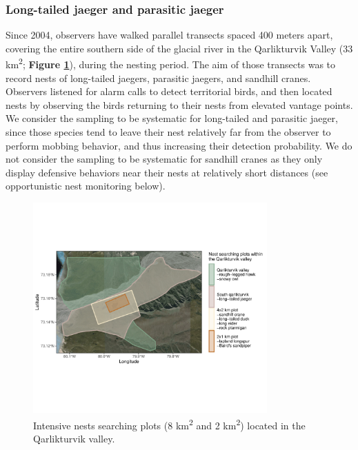 \documentclass[a4paper,twoside,10pt]{article}
\begin{document}
\subsubsection*{Long-tailed jaeger and parasitic jaeger}
Since 2004, observers have walked parallel transects spaced 400 meters apart, covering the entire southern side of the glacial river in the Qarlikturvik Valley (33 km\textsuperscript{2}; \textbf{Figure \ref{figure:qarlikturvik_valley}}), during the nesting period. The aim of those transects was to record nests of long-tailed jaegers, parasitic jaegers, and sandhill cranes. Observers listened for alarm calls to detect territorial birds, and then located nests by observing the birds returning to their nests from elevated vantage points. We consider the sampling to be systematic for long-tailed and parasitic jaeger, since those species tend to leave their nest relatively far from the observer to perform mobbing behavior, and thus increasing their detection probability. We do not consider the sampling to be systematic for sandhill cranes as they only display defensive behaviors near their nests at relatively short distances (see opportunistic nest monitoring below).

\begin{figure}
\centering
  \includegraphics[width=0.8\textwidth, angle=0]{figures/qarlikturvik_valley.pdf}
  \vspace{-70pt} %
  \caption{Intensive nests searching plots (8 km\textsuperscript{2} and 2 km\textsuperscript{2}) located in the Qarlikturvik valley.}
 \label{figure:qarlikturvik_valley}
\end{figure}
\end{document}
